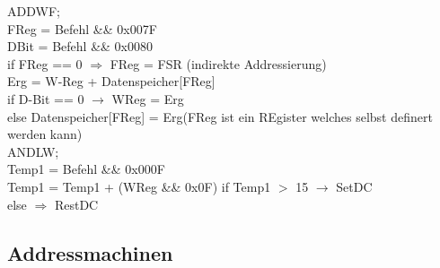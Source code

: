 ADDWF;\\
FReg = Befehl \&\& 0x007F\\
DBit = Befehl \&\& 0x0080\\
if FReg == 0 $\Longrightarrow$ FReg = FSR (indirekte Addressierung)\\
Erg = W-Reg + Datenspeicher[FReg]\\
if D-Bit == 0 $\longrightarrow$ WReg = Erg\\
else Datenspeicher[FReg] = Erg(FReg ist ein REgister welches selbst definert werden kann)\\ 

ANDLW;\\



Temp1 = Befehl \&\& 0x000F\\
Temp1 = Temp1 + (WReg \&\& 0x0F)
if Temp1 $>$ 15 $\longrightarrow$ SetDC\\
else $\Longrightarrow$ RestDC

\subsection{Addressmachinen}
